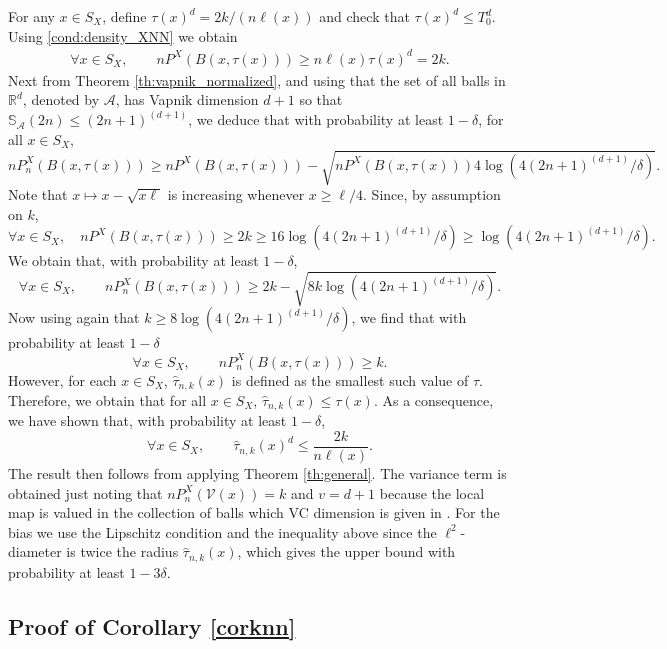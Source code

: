 \documentclass[paper=a4, fontsize=11pt]{scrartcl}
\begin{document}
For any $x\in S_X$, define $ \tau(x)^d  = 2 k /  (n \ell(x) ) $  and check that  $\tau(x)^d \leq T_0^d$. Using \ref{cond:density_XNN} we obtain 
   \begin{align*}
    \forall x\in S_X,\qquad   n P^X(B (x, \tau(x)) ) \geq n \ell(x) \tau(x)^d   = 2  k .
   \end{align*}
   Next from Theorem \ref{th:vapnik_normalized}, and using that the set of all balls in $\mathbb R^d$, denoted by $\mathcal{A}$, has Vapnik dimension $d+1$ so that $\mathbb S_\mathcal A(2n)\leq (2n+1)^{(d+1)} $,  we deduce that with probability at least $1-\delta$, for all $x \in S_X,$
   $$n P_n^X (B (x, \tau(x)) ) \geq n P^X(B (x, \tau(x)) ) - \sqrt { n P^X(B (x, \tau(x)) )  4\log( 4 (2n+1)^{(d+1)}  / \delta)   } . $$
   Note that $x\mapsto x - \sqrt{ x\ell} $ is increasing whenever $ x\geq \ell /4$. Since, by assumption on $k$, 
   $$\forall x\in S_X,\quad  n P^X(B (x, \tau(x)) ) \geq  2k \geq 16\log( 4 (2n+1)^{(d+1)}  / \delta) \geq \log( 4 (2n+1)^{(d+1)}  / \delta).   $$
   We obtain that, with probability at least $1-\delta$,
   $$ \forall x\in S_X,\qquad    n P_n^X (B (x, \tau(x)) ) \geq 2k - \sqrt {8k  \log( 4  (2n+1)^{(d+1)}  / \delta)   }  .$$
   Now using again that $k \geq  {  8 \log( 4 (2n+1)^{(d+1)} / \delta)   }  $, we find that with probability at least $1-\delta$
   $$ \forall x\in S_X,\qquad  nP_n^X(B (x, \tau(x)))\geq k .$$
   However, for each $x\in S_X$, $\hat \tau _{n,k}(x) $ is defined as the smallest such value of $\tau $. Therefore, we obtain that for all $x \in S_X$, $ \hat \tau_{n,k} (x)  \leq \tau (x)$. As a consequence, we have shown that, with probability at least $1-\delta$, 
   $$ \forall x\in S_X,\qquad  \hat \tau_{n,k}(x) ^d \leq \frac{ 2 k  }{ n \ell(x)  }.$$
The result then follows from applying Theorem \ref{th:general}. The variance term is obtained just noting that $n P_n^X (\mathcal V (x) ) = k$ and $v = d+1 $ because the local map is valued in the collection of balls which VC dimension is given in \cite{wenocur1981some}. For the bias we use the Lipschitz condition and the inequality above since the \(\ell^2\)-diameter is twice the radius \(\hat \tau_{n,k}(x)\), which gives the upper bound with probability at least \(1 - 3\delta\).

\subsection*{Proof of Corollary \ref{corknn}}
\end{document}
